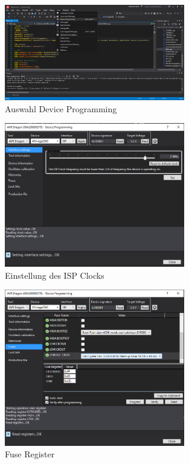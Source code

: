 \begin{figure}[h]
\centering
\includegraphics[width=0.7\textwidth]{../../../graphics/device_programming/1.PNG}
\caption{Auswahl Device Programming}
\label{fig:deviceprogramming}
\end{figure}
\begin{figure}[h]
\centering
\includegraphics[width=0.7\textwidth]{../../../graphics/device_programming/2.PNG}
\caption{Einstellung des ISP Clocks}
\label{fig:einstellung des ispclocks}
\end{figure}
\begin{figure}[h]
\centering
\includegraphics[width=0.7\textwidth]{../../../graphics/device_programming/3.PNG}
\caption{Fuse Register}
\label{fig:fuseregister}
\end{figure}
